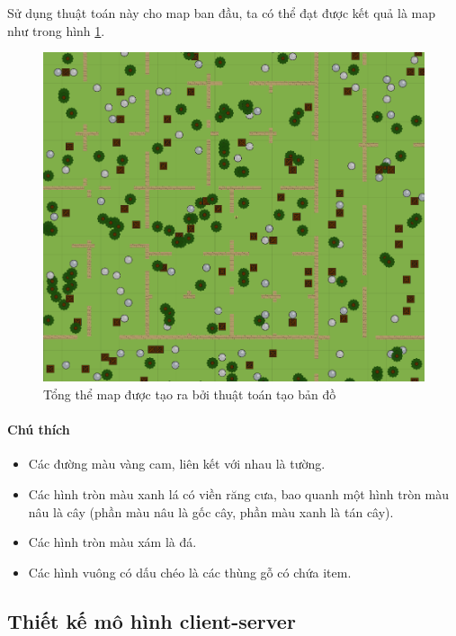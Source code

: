 \documentclass[12pt,a4paper]{article}
\begin{document}
  Sử dụng thuật toán này cho map ban đầu, ta có thể đạt được kết quả là map như trong hình \ref{mapoverview}.

  \begin{figure}[H]
  \centering
  \includegraphics[width=\textwidth]{Img/map/overview.png}
  \caption{Tổng thể map được tạo ra bởi thuật toán tạo bản đồ}
  \label{mapoverview}
  \end{figure}

  \begin{it}
    \paragraph{Chú thích}
    \begin{itemize}
      \item Các đường màu vàng cam, liên kết với nhau là tường.
      \item Các hình tròn màu xanh lá có viền răng cưa, bao quanh một hình tròn màu nâu là cây (phần màu nâu là gốc cây, phần màu xanh là tán cây).
      \item Các hình tròn màu xám là đá.
      \item Các hình vuông có dấu chéo là các thùng gỗ có chứa item.
    \end{itemize}
  \end{it}
  
  \subsection{Thiết kế mô hình client-server}
\end{document}
